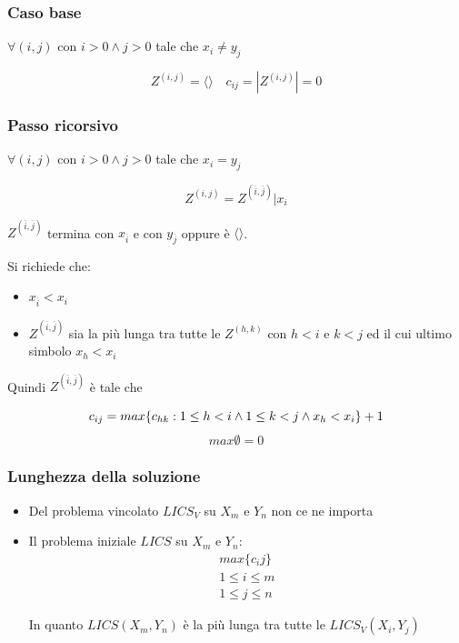 \subsubsection{Caso base}
$\forall (i,j)$ con $i>0 \land j>0$ tale che $x_i \not = y_j$

{
    \large

    $$
        Z^{(i,j)} = \langle \rangle \quad c_{ij} = |Z^{(i,j)}| = 0
    $$
}

\subsubsection{Passo ricorsivo}
$\forall(i,j)$ con $i>0 \land j>0$ tale che $x_i = y_j$
{
    \large

    $$
        Z^{(i,j)} = Z^{(\overline{i}, \overline{j})} | x_i
    $$
}

$Z^{(\overline{i}, \overline{j})}$ termina con $x_{\overline{i}}$ e con $y_{\overline{j}}$ oppure è $\langle \rangle$.

Si richiede che:
\begin{itemize}
    \item $x_{\overline{i}} < x_i$
    \item $Z^{(\overline{i}, \overline{j})}$ sia la più lunga tra tutte le $Z^{(h,k)}$ con $h<i$ e $k<j$ ed il cui ultimo simbolo $x_h<x_i$
\end{itemize}

Quindi $Z^{(\overline{i}, \overline{j})}$ è tale che

{
    \large

    $$
        c_{ij} = max\{c_{hk} : 1 \leq h < i \land 1 \leq k < j \land x_h < x_i\} + 1 \\
    $$
    $$
        max\emptyset = 0
    $$
}

\subsubsection{Lunghezza della soluzione}
\begin{itemize}
    \item Del problema vincolato $LICS_V$ su $X_m$ e $Y_n$ non ce ne importa
    \item Il problema iniziale $LICS$ su $X_m$ e $Y_n$:
    \begin{gather*}
        max\{c_ij\} \\
        1 \leq i \leq m \\
        1 \leq j \leq n
    \end{gather*}

    In quanto $LICS(X_m,Y_n)$ è la più lunga tra tutte le $LICS_V(X_i,Y_j)$
\end{itemize}

